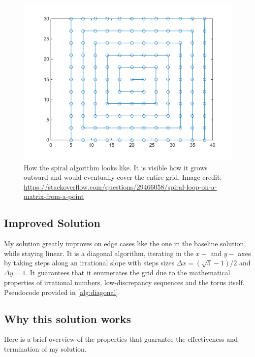\documentclass{article}
\begin{document}
\begin{figure}[H]
\begin{minipage}{0.5\textwidth}
    \end{minipage}
    \hfill
    \begin{minipage}{0.45\textwidth}
        \centering
        \includegraphics[width=\linewidth]{grid_spiral.png}
        \caption{How the spiral algorithm looks like. It is visible how it grows outward and would eventually cover the entire grid. Image credit: \url{https://stackoverflow.com/questions/29466058/spiral-loop-on-a-matrix-from-a-point}}
        \label{fig:visualization-of-spiral-algorithm}
    \end{minipage}
\end{figure}

\subsection*{Improved Solution}

My solution greatly improves on edge cases like the one in the baseline
solution, while staying linear. It is a diagonal algorithm, iterating in the
$x-$ and $y-$ axes by taking steps along an irrational slope with steps sizes
$\Delta x = (\sqrt 5 - 1)/2$ and $\Delta y = 1$. It guarantees that it
enumerates the grid due to the mathematical properties of irrational numbers,
low-discrepancy sequences and the torus itself. Pseudocode provided in
\autoref{alg:diagonal}.

\subsection*{Why this solution works}
Here is a brief overview of the properties that guarantee the effectiveness and
termination of my solution.
\end{document}
